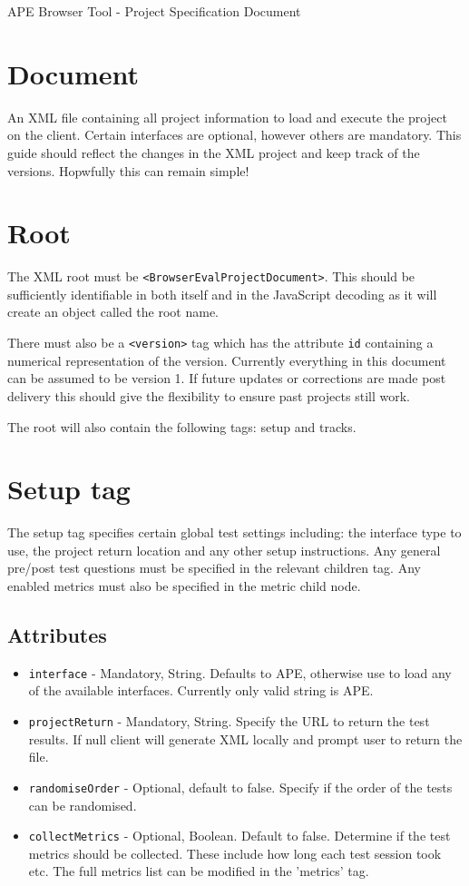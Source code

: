 \documentclass{article}
\begin{document}
\large APE Browser Tool - Project Specification Document

\section{Document}

An XML file containing all project information to load and execute the project on the client. Certain interfaces are optional, however others are mandatory. This guide should reflect the changes in the XML project and keep track of the versions. Hopwfully this can remain simple!

\section{Root}

The XML root must be \texttt{<BrowserEvalProjectDocument>}. This should be sufficiently identifiable in both itself and in the JavaScript decoding as it will create an object called the root name.

There must also be a \texttt{<version>} tag which has the attribute \texttt{id} containing a numerical representation of the version. Currently everything in this document can be assumed to be version 1. If future updates or corrections are made post delivery this should give the flexibility to ensure past projects still work.

The root will also contain the following tags: setup and tracks.

\section{Setup tag}

The setup tag specifies certain global test settings including: the interface type to use, the project return location and any other setup instructions.
Any general pre/post test questions must be specified in the relevant children tag. Any enabled metrics must also be specified in the metric child node.

\subsection{Attributes}
\begin{itemize}
\item \texttt{interface} - Mandatory, String. Defaults to APE, otherwise use to load any of the available interfaces. Currently only valid string is APE.
\item \texttt{projectReturn} - Mandatory, String. Specify the URL to return the test results. If null client will generate XML locally and prompt user to return the file.
\item \texttt{randomiseOrder} - Optional, default to false. Specify if the order of the tests can be randomised.
\item \texttt{collectMetrics} - Optional, Boolean. Default to false. Determine if the test metrics should be collected. These include how long each test session took etc. The full metrics list can be modified in the 'metrics' tag.
\end{itemize}
\end{document}
